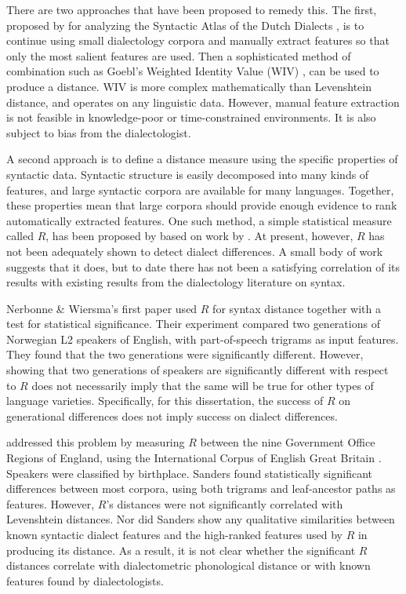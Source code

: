 \documentclass[11pt,letterpaper]{article}
\begin{document}
There are two approaches that have been proposed to remedy this. The
first, proposed by  for analyzing the Syntactic
Atlas of the Dutch Dialects \cite{barbiers05}, is to continue using
small dialectology corpora and manually extract features so that only
the most salient features are used. Then a sophisticated method of
combination such as Goebl's Weighted Identity Value (WIV)
, can be used to produce a distance. WIV is more
complex mathematically than Levenshtein distance, and operates on any
linguistic data. However, manual feature extraction is not feasible in
knowledge-poor or time-constrained environments. It is also subject to
bias from the dialectologist.

A second approach is to define a distance measure using the specific
properties of syntactic data. Syntactic structure is easily decomposed
into many kinds of features, and large syntactic corpora are available
for many languages. Together, these properties mean that large corpora
should provide enough evidence to rank automatically extracted
features. One such method, a simple statistical measure called $R$,
has been proposed by  based on work by
. At present, however, $R$ has not been adequately
shown to detect dialect differences. A small body of work suggests
that it does, but to date there has not been a satisfying correlation
of its results with existing results from the dialectology literature
on syntax.

Nerbonne \& Wiersma's first paper used $R$ for syntax distance
together with a test for statistical significance\cite{nerbonne06}.
Their experiment compared two generations of Norwegian L2 speakers of
English, with part-of-speech trigrams as input features.  They found
that the two generations were significantly different. However,
showing that two generations of speakers are significantly different
with respect to $R$ does not necessarily imply that the same will be
true for other types of language varieties. Specifically, for this
dissertation, the success of $R$ on generational differences does not
imply success on dialect differences.

 addressed this problem by measuring $R$ between
the nine Government Office Regions of England, using the International
Corpus of English Great Britain \cite{nelson02}. Speakers were
classified by birthplace. Sanders found statistically significant
differences between most corpora, using both trigrams and
leaf-ancestor paths as features. However, $R$'s distances were not
significantly correlated with Levenshtein distances. Nor did Sanders
show any qualitative similarities between known syntactic dialect
features and the high-ranked features used by $R$ in producing its
distance. As a result, it is not clear whether the significant $R$
distances correlate with dialectometric phonological distance or with
known features found by dialectologists.



\end{document}
